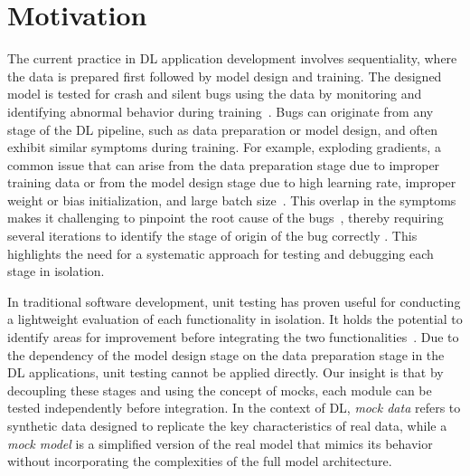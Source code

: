 \section{Motivation}
\label{sec:background}

The current practice in DL application development involves sequentiality, where the data is prepared first followed by model design and training. 
The designed model is tested for 
crash and silent bugs using the data by monitoring and identifying abnormal behavior during training~\cite{schoop2021umlaut,wardat21DeepLocalize,wardat22DeepDiagnosis,BraiekDeepChecker,cao2022deepfd,Zhang21Autotrainer,ghanbari2023deepmufl}.
Bugs can originate from any stage of the DL pipeline, such as data preparation or model design, and often exhibit similar symptoms during training.
For example, exploding gradients, a common issue that can arise from the data preparation stage due to improper training data or from the model design stage due to high learning rate, improper weight or bias initialization, and large batch size~\cite{wardat22DeepDiagnosis}. This overlap in the symptoms makes it challenging to pinpoint the root cause of the bugs~\cite{islam20repairing}, thereby requiring several iterations to identify the stage of origin of the bug correctly
\cite{schoop2021umlaut,wardat21DeepLocalize,wardat22DeepDiagnosis,BraiekDeepChecker,ghanbari2023deepmufl}.
This highlights the need for a systematic approach for testing and debugging each stage in isolation.

In traditional software development, unit testing has proven useful for conducting a lightweight evaluation of each functionality in isolation. It holds the potential to identify areas for improvement before integrating the two functionalities~\cite{runeson2006survey}.
Due to the dependency of the model design stage on the data preparation stage in the DL applications, unit testing cannot be applied directly.
Our insight is that by decoupling these stages and using the concept of mocks, each module can be tested independently before integration.
In the context of DL, \textit{mock data} refers to synthetic data designed to replicate the key characteristics of real data, while a \textit{mock model} is a simplified version of the real model that mimics its behavior without incorporating the complexities of the full model architecture.


